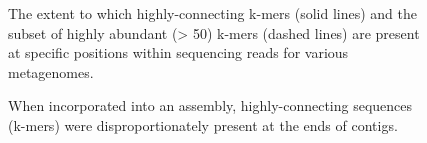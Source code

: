 \documentclass[11pt]{article} %
\begin{document}
\begin{figure}
\caption{The extent to which highly-connecting k-mers (solid lines) and the subset of highly abundant (> 50) k-mers (dashed lines) are present at specific positions within sequencing reads for various metagenomes.}
\end{figure}


\begin{figure}
\caption{When incorporated into an assembly, highly-connecting sequences (k-mers) were disproportionately present at the ends of contigs.}
\end{figure}
\end{document}
